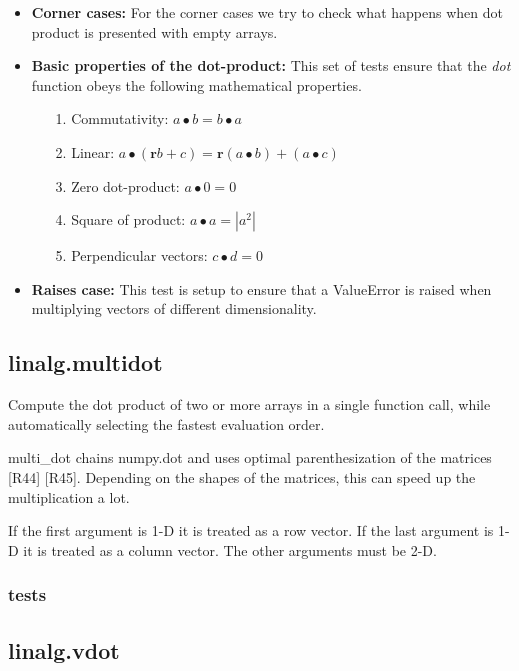 \documentclass[a4paper,11pt]{article}
\begin{document}
\begin{itemize}
	\item \textbf{Corner cases:} For the corner cases we try to check what happens when dot product is presented with empty arrays.
	
	\item \textbf{Basic properties of the dot-product:} This set of tests ensure that the \textit{dot} function obeys the following mathematical properties.
	\begin{itemize}
		\item[1.] Commutativity: $ a \bullet b = b \bullet a $ 
		\item[2.] Linear: $ a \bullet (\textbf{r}b + c) = \textbf{r}(a \bullet b) + (a \bullet c) $
		\item[3.] Zero dot-product: $ a \bullet 0 = 0 $
		\item[4.] Square of product: $ a \bullet a = | a^2 |$
		\item[5.] Perpendicular vectors: $ c \bullet d = 0$
	\end{itemize}
	
	\item \textbf{Raises case:} This test is setup to ensure that a ValueError is raised when multiplying vectors of different dimensionality.

\end{itemize}

\subsection{linalg.multidot}
Compute the dot product of two or more arrays in a single function call, while automatically selecting the fastest evaluation order.

multi\_dot chains numpy.dot and uses optimal parenthesization of the matrices [R44] [R45]. Depending on the shapes of the matrices, this can speed up the multiplication a lot.

If the first argument is 1-D it is treated as a row vector. If the last argument is 1-D it is treated as a column vector. The other arguments must be 2-D.
\subsubsection{tests}

\subsection{linalg.vdot}
\end{document}
